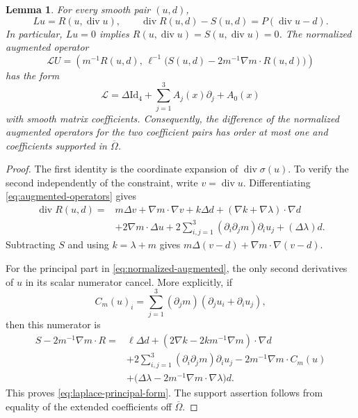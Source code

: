 \documentclass[11pt]{article}
\newcommand{\Id}{\mathrm{Id}}
\DeclareMathOperator{\diverg}{div}
\newcommand{\Lcal}{\mathcal L}
\newtheorem{lemma}[theorem]{Lemma}
\theoremstyle{remark}
\numberwithin{equation}{section}
\begin{document}
\begin{lemma}
\label{lem:augmented-system}
For every smooth pair $(u,d)$,
\begin{equation}
\label{eq:augmented-identity}
 Lu=R(u,\diverg u),\qquad
 \diverg R(u,d)-S(u,d)=P(\diverg u-d).
\end{equation}
In particular, $Lu=0$ implies $R(u,\diverg u)=S(u,\diverg u)=0$.
The normalized augmented operator
\begin{equation}
\label{eq:normalized-augmented}
 \Lcal U=
 \left(m^{-1}R(u,d),\,
 \ell^{-1}\bigl(S(u,d)-2m^{-1}\nabla m\cdot R(u,d)\bigr)\right)
\end{equation}
has the form
\begin{equation}
\label{eq:laplace-principal-form}
 \Lcal=\Delta\Id_4+\sum_{j=1}^3 A_j(x)\partial_j+A_0(x)
\end{equation}
with smooth matrix coefficients. Consequently, the difference of the
normalized augmented operators for the two coefficient pairs has order
at most one and coefficients supported in $\overline\Omega$.
\end{lemma}

\begin{proof}
The first identity is the coordinate expansion of $\diverg\sigma(u)$.
To verify the second independently of the constraint, write
$v=\diverg u$. Differentiating \eqref{eq:augmented-operators} gives
\[
\begin{aligned}
 \diverg R(u,d)
 ={}&m\Delta v+\nabla m\cdot\nabla v+k\Delta d
       +(\nabla k+\nabla\lambda)\cdot\nabla d\\
    &+2\nabla m\cdot\Delta u
       +2\sum_{i,j=1}^3(\partial_i\partial_jm)\partial_iu_j
       +(\Delta\lambda)d.
\end{aligned}
\]
Subtracting $S$ and using $k=\lambda+m$ gives
$m\Delta(v-d)+\nabla m\cdot\nabla(v-d)$.

For the principal part in \eqref{eq:normalized-augmented}, the only
second derivatives of $u$ in its scalar numerator cancel. More
explicitly, if
\[
 C_m(u)_i=\sum_{j=1}^3(\partial_jm)
                   (\partial_ju_i+\partial_iu_j),
\]
then this numerator is
\[
\begin{aligned}
 S-2m^{-1}\nabla m\cdot R
 ={}&\ell\Delta d+
   (2\nabla k-2km^{-1}\nabla m)\cdot\nabla d\\
 &+2\sum_{i,j=1}^3(\partial_i\partial_jm)\partial_iu_j
   -2m^{-1}\nabla m\cdot C_m(u)\\
 &+\bigl(\Delta\lambda-2m^{-1}\nabla m\cdot\nabla\lambda\bigr)d.
\end{aligned}
\]
This proves \eqref{eq:laplace-principal-form}. The support assertion follows
from equality of the extended coefficients off $\overline\Omega$.
\end{proof}
\end{document}
